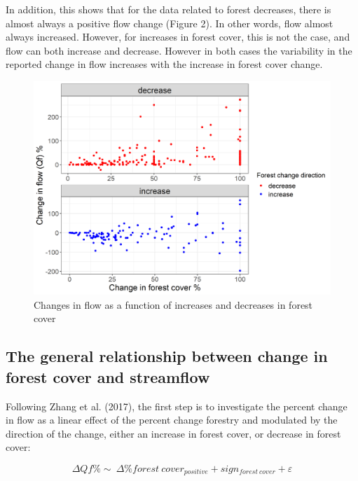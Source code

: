 \documentclass[]{elsarticle} %
\begin{document}
In addition, this shows that for the data related to forest decreases, there is almost always a positive flow change (Figure 2). In other words, flow almost always increased. However, for increases in forest cover, this is not the case, and flow can both increase and decrease. However in both cases the variability in the reported change in flow increases with the increase in forest cover change.

\begin{figure}
\includegraphics[width=0.9\linewidth]{Increase_decrease} \caption{Changes in flow as a function of increases and decreases in forest cover}\label{fig:increasedecrease}
\end{figure}

\hypertarget{the-general-relationship-between-change-in-forest-cover-and-streamflow}{%
\subsection{The general relationship between change in forest cover and streamflow}\label{the-general-relationship-between-change-in-forest-cover-and-streamflow}}

Following Zhang et al. (2017), the first step is to investigate the percent change in flow as a linear effect of the percent change forestry and modulated by the direction of the change, either an increase in forest cover, or decrease in forest cover:

\begin{equation}
\Delta Qf \% \sim ~ \Delta \% forest~cover_{positive} + sign_{forest~cover} + \varepsilon \label{eq:eq3}
\end{equation}
\end{document}
